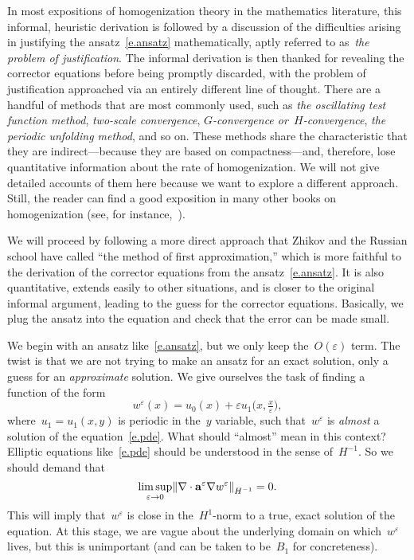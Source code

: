 \documentclass[11pt,twoside]{article} %
\numberwithin{equation}{section}
\theoremstyle{definition}
\let\originalleft\left
\let\originalright\right
\renewcommand{\left}{\mathopen{}\mathclose\bgroup\originalleft}
\renewcommand{\right}{\aftergroup\egroup\originalright}
\newcommand{\eps}{\varepsilon}
\newcommand{\ep}{\eps}
\renewcommand{\a}{\mathbf{a}}
\begin{document}
\smallskip

In most expositions of homogenization theory in the mathematics literature, 
this informal, heuristic derivation is followed by a discussion of the difficulties arising in justifying the ansatz~\eqref{e.ansatz} mathematically, aptly referred to as~\emph{the problem of justification}. The informal derivation is then thanked for revealing the corrector equations before being promptly discarded, with the problem of justification approached via an entirely different line of thought. There are a handful of methods that are most commonly used, such as \emph{the oscillating test function method}, \emph{two-scale convergence}, \emph{$G$-convergence or~$H$-convergence},  \emph{the periodic unfolding method}, and so on. 
These methods share the characteristic that they are indirect---because they are based on compactness---and, therefore, lose quantitative information about the rate of homogenization. 
We will not give detailed accounts of them here because we want to explore a different approach. Still, the reader can find a good exposition in many other books on homogenization (see, for instance,~\cite{T,Allaire,CD}).

\smallskip

We will proceed by following a more direct approach that Zhikov and the Russian school have called ``the method of first approximation,'' which is more faithful to the derivation of the corrector equations from the ansatz~\eqref{e.ansatz}. It is also quantitative, extends easily to other situations, and is closer to the original informal argument, leading to the guess for the corrector equations. Basically, we plug the ansatz into the equation and check that the error can be made small. 

\smallskip

We begin with an ansatz like~\eqref{e.ansatz}, but we only keep the~$O(\ep)$ term. The twist is that we are not trying to make an ansatz for an exact solution, only a guess for an \emph{approximate} solution. We give ourselves the task of finding a function of the form
\begin{equation}
\label{e.guess}
w^\ep (x) = u_0(x) + \ep u_1\bigl( x,\tfrac x\ep \bigr), 
\end{equation}
where~$u_1=u_1(x,y)$ is periodic in the~$y$ variable, such that~$w^\ep$ is \emph{almost} a solution of the equation~\eqref{e.pde}. What should ``almost'' mean in this context? Elliptic equations like~\eqref{e.pde} should be understood in the sense of~$H^{-1}$. So we should demand that
\begin{equation}
\label{e.demand}
\limsup_{\ep\to 0}
\left\| \nabla\cdot \a^\ep\nabla w^\ep \right\|_{H^{-1}}  
=0.
\end{equation}
This will imply that~$w^\ep$ is close in the~$H^1$-norm to a true, exact solution of the equation. At this stage, we are  vague about the underlying domain on which~$w^\ep$ lives, but this is unimportant (and can be taken to be~$B_1$ for concreteness). 
\end{document}
